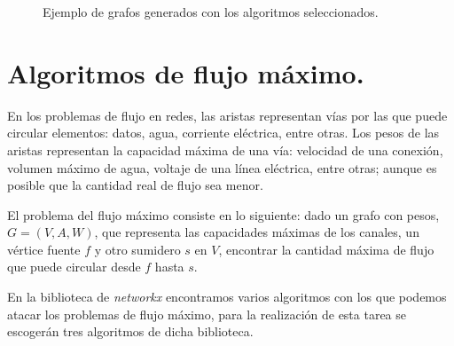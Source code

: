 \documentclass{article}
\begin{document}
\begin{figure}[h]

\caption{Ejemplo de grafos generados con los algoritmos seleccionados.}
\label{fig2} 
\end{figure}


\newpage
\section{Algoritmos de flujo máximo.}
En los problemas de flujo en redes, las aristas representan vías por las que puede circular elementos: datos, agua, corriente eléctrica, entre otras. Los pesos de las aristas representan la capacidad máxima de una vía: velocidad de una conexión, volumen máximo de agua, voltaje de una línea eléctrica, entre otras; aunque es posible que la cantidad real de flujo sea menor.
 
El problema del flujo máximo consiste en lo siguiente: dado un grafo con pesos, $G = (V, A, W)$, que representa las capacidades máximas de los canales, un vértice fuente $f$ y otro sumidero $s$ en $ V $, encontrar la cantidad máxima de flujo que puede circular desde $f$ hasta $s$.

En la biblioteca de \textit{networkx} encontramos varios algoritmos con los que podemos atacar los problemas de flujo máximo, para la realización de esta tarea se escogerán tres algoritmos de dicha biblioteca.
\end{document}
